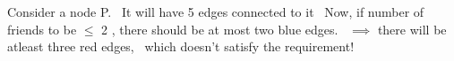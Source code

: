 \documentclass[preview]{standalone}
\begin{document}
\begin{center}
Consider a node P. \ It will have 5 edges connected to it \ Now, if number of friends to be $\le$ 2 , there should be at most two blue edges. \ $\implies$ there will be atleast three red edges, \ which doesn't satisfy the requirement!
\end{center}
\end{document}
